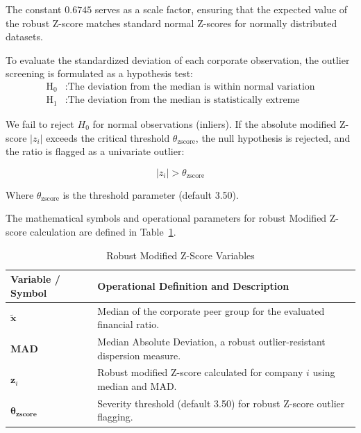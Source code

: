 The constant $0.6745$ serves as a scale factor, ensuring that the expected value of the robust Z-score matches standard normal Z-scores for normally distributed datasets. 

To evaluate the standardized deviation of each corporate observation, the outlier screening is formulated as a hypothesis test:
\begin{align}
    \text{H}_0 &: \text{The deviation from the median is within normal variation} \\
    \text{H}_1 &: \text{The deviation from the median is statistically extreme}
\end{align}

We fail to reject $H_0$ for normal observations (inliers). If the absolute modified Z-score $|z_i|$ exceeds the critical threshold $\theta_{\text{zscore}}$, the null hypothesis is rejected, and the ratio is flagged as a univariate outlier:

\begin{equation}
    |z_i| > \theta_{\text{zscore}}
\end{equation}

Where $\theta_{\text{zscore}}$ is the threshold parameter (default 3.50).

The mathematical symbols and operational parameters for robust Modified Z-score calculation are defined in Table~\ref{tab:glossary_zscore}.

\begin{table}[H]
    \centering
    \renewcommand{\arraystretch}{0.85}
    \caption{Robust Modified Z-Score Variables}
    \label{tab:glossary_zscore}
    \footnotesize
    \begin{tabularx}{\textwidth}{lX}
        \toprule
        \textbf{Variable / Symbol} & \textbf{Operational Definition and Description} \\
        \midrule
        $\boldsymbol{\tilde{x}}$ & Median of the corporate peer group for the evaluated financial ratio. \\
        $\mathbf{MAD}$ & Median Absolute Deviation, a robust outlier-resistant dispersion measure. \\
        $\mathbf{z}_i$ & Robust modified Z-score calculated for company $i$ using median and MAD. \\
        $\boldsymbol{\theta}_{\mathbf{zscore}}$ & Severity threshold (default 3.50) for robust Z-score outlier flagging. \\
        \bottomrule
    \end{tabularx}
\end{table}

